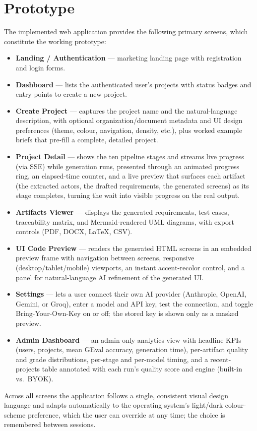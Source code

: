 \documentclass[12pt,a4paper,oneside]{report}
\begin{document}
\section{Prototype}
The implemented web application provides the following primary screens, which constitute the working prototype:
\begin{itemize}[leftmargin=*,nosep]
  \item \textbf{Landing / Authentication} --- marketing landing page with registration and login forms.
  \item \textbf{Dashboard} --- lists the authenticated user's projects with status badges and entry points to create a new project.
  \item \textbf{Create Project} --- captures the project name and the natural-language description, with optional organization/document metadata and UI design preferences (theme, colour, navigation, density, etc.), plus worked example briefs that pre-fill a complete, detailed project.
  \item \textbf{Project Detail} --- shows the ten pipeline stages and streams live progress (via SSE) while generation runs, presented through an animated progress ring, an elapsed-time counter, and a live preview that surfaces each artifact (the extracted actors, the drafted requirements, the generated screens) as its stage completes, turning the wait into visible progress on the real output.
  \item \textbf{Artifacts Viewer} --- displays the generated requirements, test cases, traceability matrix, and Mermaid-rendered UML diagrams, with export controls (PDF, DOCX, LaTeX, CSV).
  \item \textbf{UI Code Preview} --- renders the generated HTML screens in an embedded preview frame with navigation between screens, responsive (desktop/tablet/mobile) viewports, an instant accent-recolor control, and a panel for natural-language AI refinement of the generated UI.
  \item \textbf{Settings} --- lets a user connect their own AI provider (Anthropic, OpenAI, Gemini, or Groq), enter a model and API key, test the connection, and toggle Bring-Your-Own-Key on or off; the stored key is shown only as a masked preview.
  \item \textbf{Admin Dashboard} --- an admin-only analytics view with headline KPIs (users, projects, mean GEval accuracy, generation time), per-artifact quality and grade distributions, per-stage and per-model timing, and a recent-projects table annotated with each run's quality score and engine (built-in vs.\ BYOK).
\end{itemize}
Across all screens the application follows a single, consistent visual design language and adapts automatically to the operating system's light/dark colour-scheme preference, which the user can override at any time; the choice is remembered between sessions.
\end{document}
